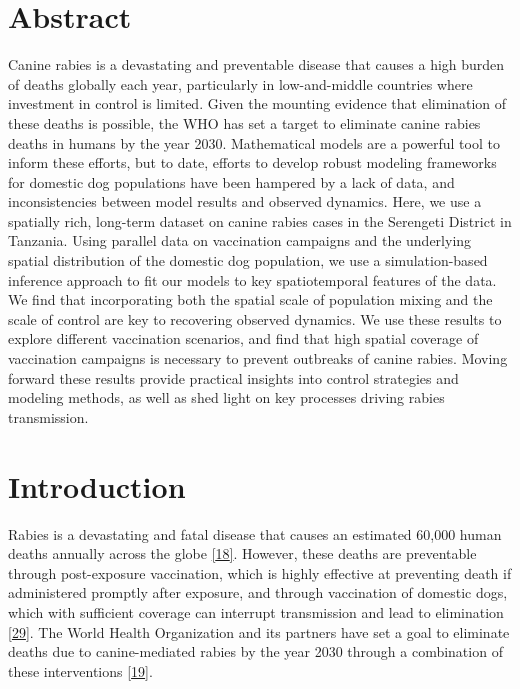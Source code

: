 \documentclass[
  oneside]{book}
\newcommand{\beginmain}{
  \setcounter{table}{0}  
  \renewcommand{\thetable}{\arabic{chapter}.\arabic{table}} 
  \setcounter{figure}{0} 
  \renewcommand{\thefigure}{\arabic{chapter}.\arabic{figure}}
}
\begin{document}
\newpage
\beginmain

\setlength{\parskip}{2em}

\hypertarget{abstract-3}{%
\section*{Abstract}\label{abstract-3}}

Canine rabies is a devastating and preventable disease that causes a high burden of deaths globally each year, particularly in low-and-middle countries where investment in control is limited. Given the mounting evidence that elimination of these deaths is possible, the WHO has set a target to eliminate canine rabies deaths in humans by the year 2030. Mathematical models are a powerful tool to inform these efforts, but to date, efforts to develop robust modeling frameworks for domestic dog populations have been hampered by a lack of data, and inconsistencies between model results and observed dynamics. Here, we use a spatially rich, long-term dataset on canine rabies cases in the Serengeti District in Tanzania. Using parallel data on vaccination campaigns and the underlying spatial distribution of the domestic dog population, we use a simulation-based inference approach to fit our models to key spatiotemporal features of the data. We find that incorporating both the spatial scale of population mixing and the scale of control are key to recovering observed dynamics. We use these results to explore different vaccination scenarios, and find that high spatial coverage of vaccination campaigns is necessary to prevent outbreaks of canine rabies. Moving forward these results provide practical insights into control strategies and modeling methods, as well as shed light on key processes driving rabies transmission.

\hypertarget{introduction-4}{%
\section{Introduction}\label{introduction-4}}

Rabies is a devastating and fatal disease that causes an estimated 60,000 human deaths annually across the globe \protect\hyperlink{ref-hampson2015}{{[}18{]}}. However, these deaths are preventable through post-exposure vaccination, which is highly effective at preventing death if administered promptly after exposure, and through vaccination of domestic dogs, which with sufficient coverage can interrupt transmission and lead to elimination \protect\hyperlink{ref-lankester2014}{{[}29{]}}. The World Health Organization and its partners have set a goal to eliminate deaths due to canine-mediated rabies by the year 2030 through a combination of these interventions \protect\hyperlink{ref-abela-ridder2016}{{[}19{]}}.
\end{document}
